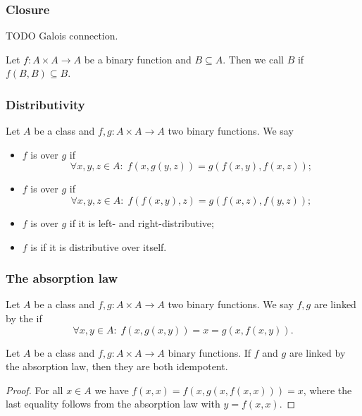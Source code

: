 \subsubsection{Closure}
TODO Galois connection.
\begin{definition}
Let $f:A\times A\to A$ be a binary function and $B\subseteq A$. Then we call $B$  if $f(B,B) \subseteq B$.
\end{definition}

\subsubsection{Distributivity}
\begin{definition}
Let $A$ be a class and $f,g: A\times A \to A$ two binary functions. We say
\begin{itemize}
\item $f$ is  over $g$ if
\[ \forall x,y,z\in A: \; f(x,g(y,z)) = g(f(x,y),f(x,z)); \]
\item $f$ is  over $g$ if
\[ \forall x,y,z\in A: \; f(f(x,y), z) = g(f(x,z),f(y,z)); \]
\item $f$ is  over $g$ if it is left- and right-distributive;
\item $f$ is  if it is distributive over itself.
\end{itemize}
\end{definition}

\subsubsection{The absorption law}
\begin{definition}
Let $A$ be a class and $f,g: A\times A \to A$ two binary functions.
We say $f, g$ are linked by the  if
\[ \forall x,y\in A:\; f(x,g(x,y)) = x = g(x,f(x,y)). \]
\end{definition}

\begin{lemma} \label{absorptionIdempotency}
Let $A$ be a class and $f,g: A\times A\to A$ binary functions. If $f$ and $g$ are linked by the absorption law, then they are both idempotent.
\end{lemma}
\begin{proof}
For all $x\in A$ we have $f(x,x) = f(x,g(x,f(x,x))) = x$, where the last equality follows from the absorption law with $y = f(x,x)$.
\end{proof}



